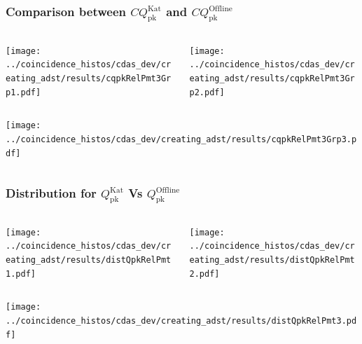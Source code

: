 \documentclass[aspectratio=169]{beamer}
\begin{document}
\begin{frame}
  \frametitle{Comparison between
  $CQ^{\mathrm{Kat}}_{\mathrm{pk}}$ and
  $CQ^{\mathrm{Offline}}_{\mathrm{pk}}$}
  \vspace{0.1cm}
  \begin{columns}
    \centering
    \begin{column}{0.5\textwidth}
      \texttt{[image: ../coincidence\_histos/cdas\_dev/creating\_adst/results/cqpkRelPmt3Grp1.pdf]}
    \end{column}
    \begin{column}{0.5\textwidth}
      \texttt{[image: ../coincidence\_histos/cdas\_dev/creating\_adst/results/cqpkRelPmt3Grp2.pdf]}
    \end{column}
  \end{columns}

  \begin{columns}
    \centering
    \begin{column}{0.5\textwidth}
      \texttt{[image: ../coincidence\_histos/cdas\_dev/creating\_adst/results/cqpkRelPmt3Grp3.pdf]}
    \end{column}
  \end{columns}
\end{frame}


\begin{frame}
  \frametitle{Distribution for $Q^{\mathrm{Kat}}_{\mathrm{pk}}$ Vs
  $Q^{\mathrm{Offline}}_{\mathrm{pk}}$}
  \vspace{0.1cm}
  \begin{columns}
    \centering
    \begin{column}{0.5\textwidth}
      \texttt{[image: ../coincidence\_histos/cdas\_dev/creating\_adst/results/distQpkRelPmt1.pdf]}
    \end{column}
    \begin{column}{0.5\textwidth}
      \texttt{[image: ../coincidence\_histos/cdas\_dev/creating\_adst/results/distQpkRelPmt2.pdf]}
    \end{column}
  \end{columns}
  \begin{columns}
    \centering
    \begin{column}{0.5\textwidth}
      \texttt{[image: ../coincidence\_histos/cdas\_dev/creating\_adst/results/distQpkRelPmt3.pdf]}
    \end{column}
  \end{columns}
\end{frame}
\end{document}

